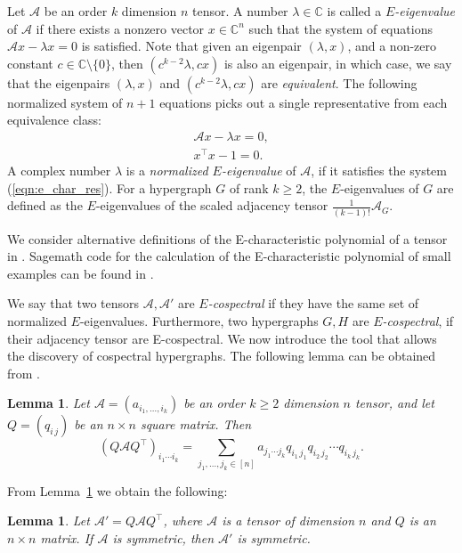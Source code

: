 \documentclass[12pt]{article}
\numberwithin{equation}{section}
\newtheorem{lemma}[theorem]{Lemma}
\theoremstyle{definition}
\newcommand{\ev}[1]{( #1 )}
\newcommand{\C}{\mathbb{C}}
\begin{document}
Let $\mathcal{A}$ be an order $k$ dimension $n$ tensor. A number $\lambda \in \mathbb{C}$ is called a \emph{$E$-eigenvalue} of $\mathcal{A}$ if there exists a nonzero vector $x \in \mathbb{C}^n$ such that the system of equations $\mathcal{A}x - \lambda x = 0$ is satisfied. Note that given an eigenpair $\ev{ \lambda, x}$, and a non-zero constant $c\in \C\setminus \{0\}$, then $\ev{ c^{k-2}\lambda, cx}$ is also an eigenpair, in which case, we say that the eigenpairs $\ev{ \lambda, x}$ and $\ev{ c^{k-2}\lambda, cx}$ are \textit{equivalent}. The following normalized system of $n+1$ equations picks out a single representative from each equivalence class:
\begin{equation}
\label{eqn:e_char_res} 
\begin{split}
\mathcal{A}x - \lambda x = 0, \\ 
x^\top x - 1 = 0.
\end{split}
\end{equation}
A complex number $\lambda$ is a \textit{normalized $E$-eigenvalue} of $\mathcal{A}$, if it satisfies the system (\ref{eqn:e_char_res}). For a hypergraph $G$ of rank $k\geq 2$, the $E$-eigenvalues of $G$ are defined as the $E$-eigenvalues of the scaled adjacency tensor $\frac{1}{\ev{k-1}!} \mathcal{A}_G$. 


We consider alternative definitions of the E-characteristic polynomial of a tensor in . Sagemath code for the calculation of the E-characteristic polynomial of small examples can be found in \cite{github}. 

We say that two tensors $\mathcal{A},\mathcal{A}'$ are \emph{$E$-cospectral} if they have the same set of normalized $E$-eigenvalues. Furthermore, two hypergraphs $G,H$ are \emph{$E$-cospectral}, if their adjacency tensor are E-cospectral. We now introduce the tool that allows the discovery of cospectral hypergraphs. The following lemma can be obtained from \cite[Eq. (2.1)]{shao}.

\begin{lemma}\label{lem:l.count} Let $\mathcal{A}=(a_{i_1,\ldots, i_k})$ be an order $k\geq 2$ dimension $n$ tensor, and let $Q=(q_{i\,j})$ be an $n\times n$ square matrix. Then
$$(Q\mathcal{A}Q^\top)_{i_1\cdots i_k} = \sum\limits_{j_1,\dots,j_k\in[n]} a_{j_1\cdots j_k}q_{i_1\,j_1}q_{i_2\,j_2}\cdots q_{i_k\,j_k}.$$
\end{lemma}

From Lemma~\ref{lem:l.count} we obtain the following:
\begin{lemma}\label{l.sym}
Let $\mathcal{A}'=Q\mathcal{A}Q^\top$, where $\mathcal{A}$ is a tensor of dimension $n$ and $Q$ is an $n\times n$ matrix. If $\mathcal{A}$ is symmetric, then $\mathcal{A}'$ is symmetric.
\end{lemma}
\end{document}
